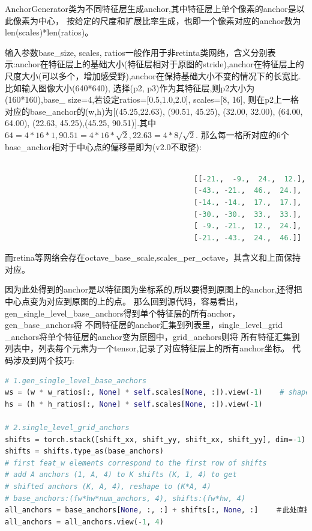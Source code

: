 \documentclass[UTF8]{ctexart}
\begin{document}
AnchorGenerator类为不同特征层生成anchor,其中特征层上单个像素的anchor是以此像素为中心，
按给定的尺度和扩展比率生成，也即一个像素对应的anchor数为len(scales)*len(ratios)。

输入参数base\_size, scales, ratios一般作用于非retinta类网络，含义分别表示:anchor在特征层上的基础大小(特征层相对于原图的stride),anchor在特征层上的尺度大小(可以多个，增加感受野),anchor在保持基础大小不变的情况下的长宽比.
比如输入图像大小(640*640), 选择(p2, p3)作为其特征层,则p2大小为(160*160),base\_ size=4,若设定ratios=[0.5,1.0,2.0], scales=[8, 16],
则在p2上一格对应的base\_anchor的(w,h)为[(45.25,22.63),  (90.51, 45.25),
 (32.00, 32.00),  (64.00, 64.00), (22.63, 45.25),(45.25, 90.51)].其中$64=4*16*1,90.51=4*16*\sqrt{2}, 22.63=4*8/\sqrt{2}.$
 那么每一格所对应的6个base\_anchor相对于中心点的偏移量即为(v2.0不取整):
\lstset{style=mystyle}
\begin{lstlisting}[language=Python]
	
											[[-21.,  -9.,  24.,  12.],
											[-43., -21.,  46.,  24.],
											[-14., -14.,  17.,  17.],
											[-30., -30.,  33.,  33.],
											[ -9., -21.,  12.,  24.],
											[-21., -43.,  24.,  46.]]

\end{lstlisting}

而retina等网络会存在octave\_base\_scale,scales\_per\_octave，其含义和上面保持对应。

因为此处得到的anchor是以特征图为坐标系的,所以要得到原图上的anchor,还得把中心点变为对应到原图的上的点。
那么回到源代码，容易看出，gen\_single\_level\_base\_anchors得到单个特征层的所有anchor，gen\_base\_anchors将
不同特征层的anchor汇集到列表里，single\_level\_grid
\_anchors将单个特征层的anchor变为原图中，grid\_anchors则将
所有特征汇集到列表中，列表每个元素为一个tensor,记录了对应特征层上的所有anchor坐标。
代码涉及到两个技巧:
\lstset{style=mystyle}
\begin{lstlisting}[language=Python]
# 1.gen_single_level_base_anchors
ws = (w * w_ratios[:, None] * self.scales[None, :]).view(-1)    # shape: (len(ratios), len(scales))
hs = (h * h_ratios[:, None] * self.scales[None, :]).view(-1)

# 2.single_level_grid_anchors
shifts = torch.stack([shift_xx, shift_yy, shift_xx, shift_yy], dim=-1)
shifts = shifts.type_as(base_anchors)
# first feat_w elements correspond to the first row of shifts
# add A anchors (1, A, 4) to K shifts (K, 1, 4) to get
# shifted anchors (K, A, 4), reshape to (K*A, 4)
# base_anchors:(fw*hw*num_anchors, 4), shifts:(fw*hw, 4)
all_anchors = base_anchors[None, :, :] + shifts[:, None, :]    ＃此处直接理解较难
all_anchors = all_anchors.view(-1, 4)
\end{lstlisting}
\end{document}
